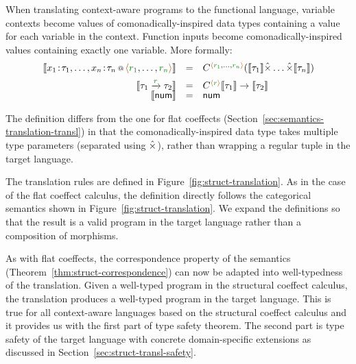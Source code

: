 When translating context-aware programs to the functional language, variable contexts become
values of comonadically-inspired data types containing a value for each variable in the context.
Function inputs become comonadically-inspired values containing exactly one variable. More formally:
%
\begin{equation*}
\begin{array}{rcl}
\sem{\coctx{x_1\!:\!\tau_1, \ldots, x_n\!:\!\tau_n}{\alift{\cclrd{r_1}, \ldots, \cclrd{r_n}}}} &=&
  \ctyp{\alift{\cclrd{r_1}, \ldots, \cclrd{r_n}}}{(\sem{\tau_1} \xtimes \ldots \xtimes \sem{\tau_n})} \\[0.5em]
\sem{\tau_1 \xrightarrow{\cclrd{r}} \tau_2} & = & \ctyp{\alift{\cclrd{r}}}{\sem{\tau_1}} \rightarrow \sem{\tau_2} \\[-0.2em]
\sem{\ident{num}} & = & \ident{num} \\
\end{array}
\end{equation*}

\noindent
The definition differs from the one for flat coeffects (Section~\ref{sec:semantics-translation-transl})
in that the comonadically-inspired data type takes multiple type parameters (separated using $\hat{\times}$),
rather than wrapping a regular tuple in the target language.

The translation rules are defined in Figure~\ref{fig:struct-translation}. As in the case of the flat
coeffect calculus, the definition directly follows the categorical semantics shown in
Figure~\ref{fig:struct-translation}. We expand the definitions so that the result is a valid
program in the target language rather than a composition of morphisms.

As with flat coeffects, the correspondence property of the semantics (Theorem~\ref{thm:struct-correspondence})
can now be adapted into well-typedness of the translation. Given a well-typed program in the
structural coeffect calculus, the translation produces a well-typed program in the target
language. This is true for all context-aware languages based on the structural coeffect calculus
and it provides us with the first part of type safety theorem. The second part is type safety
of the target language with concrete domain-specific extensions as discussed in
Section~\ref{sec:struct-transl-safety}.

